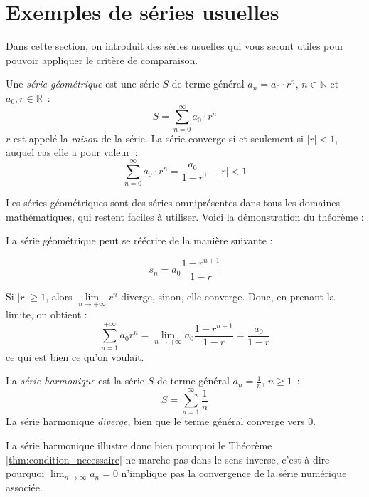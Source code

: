 \section{Exemples de séries usuelles}\label{sec:series_exemples}
Dans cette section, on introduit des séries usuelles qui vous seront utiles pour pouvoir appliquer le critère de comparaison.

\begin{boxdef}
Une \emph{série géométrique} est une série $S$ de terme général $a_n = a_0 \cdot r^n$, $n \in \mathbb{N}$ et $a_0, r \in \mathbb{R}$~:
\begin{equation}
S = \sum_{n = 0}^{\infty} a_0 \cdot r^n
\end{equation}
$r$ est appelé la \emph{raison} de la série. La série converge si et seulement si $|r| < 1$, auquel cas elle a pour valeur~:
\begin{equation}
\sum_{n = 0}^{\infty} a_0 \cdot r^n = \frac{a_0}{1-r}, \quad |r| < 1
\end{equation}
%
\end{boxdef}
Les séries géométriques sont des séries omniprésentes dans tous les domaines mathématiques, qui restent faciles à utiliser. Voici la démonstration du théorème :

La série géométrique peut se réécrire de la manière suivante :

$$s_n = a_0\frac{1-r^{n+1}}{1-r}$$

Si $\lvert r \rvert \ge 1$, alors $\lim\limits_{n \rightarrow +\infty}r^n$ diverge, sinon, elle converge.
Donc, en prenant la limite, on obtient :
$$\sum_{n=1}^{+\infty}a_0r^n =\lim\limits_{n \rightarrow +\infty}a_0 \frac{1-r^{n+1}}{1-r} = \frac{a_0}{1-r}$$
ce qui est bien ce qu'on voulait.


\begin{boxdef}
La \emph{série harmonique} est la série $S$ de terme général $a_n = \frac{1}{n}$, $n \geq 1$~:
\begin{equation}
S = \sum_{n = 1}^{\infty} \frac{1}{n}
\end{equation}
La série harmonique \emph{diverge}, bien que le terme général converge vers $0$.
\end{boxdef}
La série harmonique illustre donc bien pourquoi le Théorème \ref{thm:condition_necessaire} ne marche pas dans le sens inverse, c'est-à-dire pourquoi $\displaystyle\lim_{n \to \infty} a_n = 0$ n'implique pas la convergence de la série numérique associée.

